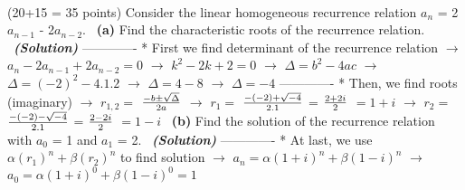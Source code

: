 \documentclass[a4 paper]{article}
\numberwithin{equation}{section}
\newcommand{\problem}[2]{~\\\fbox{\textbf{Problem #1}}\hfill (#2 points)\newline\newline}
\newcommand{\subproblem}[1]{~\newline\textbf{(#1)}}
\newcommand{\solution}{~\newline\textbf{\textit{(Solution)}} }
\newcommand{\0}{\mathbf{0}}
\begin{document}
\newline
\newline
\problem{3}{20+15 = 35}
Consider the linear homogeneous recurrence relation $a_n$ = 2$a_{n-1}$ - 2$a_{n-2}$.
\subproblem{a} Find the characteristic roots of the recurrence relation.
\newline
\solution
\newline
\newline
------------- \newline 
* First we find determinant of the recurrence relation \newline \newline
$\to$ $a_n - 2a_{n-1} + 2a_{n-2} = 0$ \newline \newline
$\to$ $k^2 - 2k + 2 = 0$ \newline \newline
$\to$ $\Delta = b^2 - 4ac$ \newline \newline
$\to$ $\Delta = (-2)^2 - 4.1.2$ \newline \newline
$\to$ $\Delta = 4 - 8$ \newline \newline
$\to$ $\Delta = -4$ \newline \newline
------------- \newline 
* Then, we find roots (imaginary) \newline \newline
$\to$ $r_{1,2} =$ $-b\pm\sqrt{\Delta}\over2a$ \newline \newline
$\to$ $r_{1} =$ $-(-2)+\sqrt{-4}\over2.1$ = $2 + 2i\over2$ $= 1+i$ \newline \newline
$\to$ $r_{2} =$ $-(-2)-\sqrt{-4}\over2.1$ = $2 - 2i\over2$ $= 1-i$ \newline
\subproblem{b} Find the solution of the recurrence relation with $a_0$ = 1 and $a_1$ = 2.
\newline
\solution
\newline
------------- \newline 
* At last, we use $\alpha(r_1)^n+\beta(r_2)^n $ to find solution \newline \newline
$\to$ $a_n = \alpha(1+i)^n+\beta(1-i)^n$ \newline \newline
$\to$ $a_0 = \alpha(1+i)^0+\beta(1-i)^0 = 1$ \newline \newline
\end{document}
